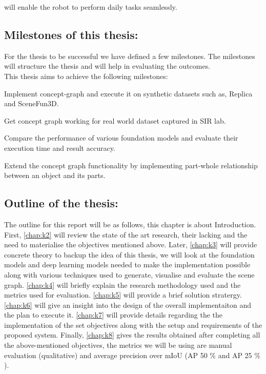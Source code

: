 will enable the robot to perform daily tasks seamlessly. 

\subsection{Milestones of this thesis:}
For the thesis to be successful we have defined a few milestones. The milestones will structure the thesis and will help in evaluating the outcomes.\\

This thesis aims to achieve the following milestones:
\begin{compactenum}[1.]
\item	Implement concept-graph and execute it on synthetic datasets such as, Replica and SceneFun3D.
\item	Get concept graph working for real world dataset captured in SIR lab.
\item	Compare the performance of various foundation models and evaluate their execution time and result accuracy.
\item	Extend the concept graph functionality by implementing part-whole relationship between an object and its parts.
\end{compactenum}
\subsection{Outline of the thesis:}	
The outline for this report will be as follows, this chapter is about Introduction. 
First, \cref{chap:k2} will review the state of the art research, their lacking and the need to materialise the objectives mentioned above. 
Later, \cref{chap:k3} will provide concrete theory to backup the idea of this thesis, we will look at the foundation models and deep learning models
needed to make the implementation possible along with various techniques used to generate, visualise and evaluate the scene graph.
\cref{chap:k4} will briefly explain the research methodology used and the metrics used for evaluation.
\cref{chap:k5} will provide a brief solution stratergy. \cref{chap:k6} will give an insight into the design of the overall implementaiton and the plan to 
execute it.
\cref{chap:k7} will provide details regarding the the implementation of the set objectives along with the setup and requirements of the proposed system. 
Finally, \cref{chap:k8} gives the results obtained after completing all the above-mentioned objectives, the metrics we will be using are 
manual evaluation (qualitative) and average precision over mIoU (AP 50 \% and AP 25 \% ).
